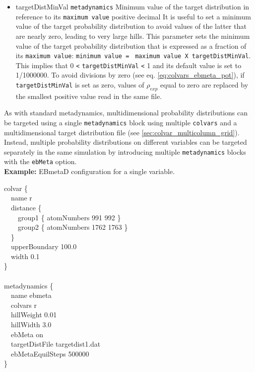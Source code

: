 \begin{itemize}
\item %
  \key
    {targetDistMinVal}{%
    \texttt{metadynamics}}{%
    Minimum value of the target distribution in reference to its \texttt{maximum value}}{%
    positive decimal}{%
    It is useful to set a minimum value of the target probability distribution to avoid values of the latter that are nearly zero, leading to very large hills.
    This parameter sets the minimum value of the target probability distribution that is expressed as a fraction of its \texttt{maximum value}: \texttt{minimum value = }
    \texttt{maximum value}\texttt{ X }\texttt{targetDistMinVal}. This implies that 0 \texttt{<} \texttt{targetDistMinVal} \texttt{<} 1 and its default value is set to 1/1000000.
    To avoid divisions by zero (see eq.{} \ref{eq:colvars_ebmeta_pot}), if \texttt{targetDistMinVal} is set as zero, values of $\rho_{exp}$ equal to zero are replaced by the
    smallest positive value read in the same file.
}

\end{itemize}

As with standard metadynamics, multidimensional probability distributions can be targeted using a single \texttt{metadynamics} block using multiple \texttt{colvars} and a multidimensional target distribution file (see \ref{sec:colvar_multicolumn_grid}).
Instead, multiple probability distributions on different variables can be targeted separately in the same simulation by introducing multiple \texttt{metadynamics} blocks with the \texttt{ebMeta} option.
\\

\noindent\textbf{Example:} EBmetaD configuration for a single variable.
\begin{cvexampleinput}
\-colvar \{\\
\-\-~~name r \\
\-\-~~distance \{\\
\-\-~~~~group1 \{ atomNumbers 991 992 \}\\
\-\-~~~~group2 \{ atomNumbers 1762 1763 \}\\
\-\-~~\}\\
\-\-~~upperBoundary  100.0 \\
\-\-~~width            0.1 \\
\-\}\\
\\
\-metadynamics \{\\
\-\-~~name              ebmeta\\
\-\-~~colvars           r\\
\-\-~~hillWeight        0.01\\
\-\-~~hillWidth         3.0\\
\-\-~~ebMeta            on\\
\-\-~~targetDistFile    targetdist1.dat\\
\-\-~~ebMetaEquilSteps  500000\\
\-\}
\end{cvexampleinput}

